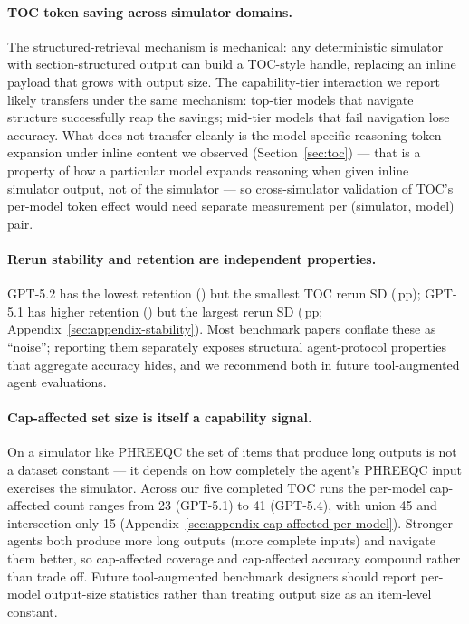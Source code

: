 \documentclass{article}
\begin{document}
\paragraph{TOC token saving across simulator domains.}
The structured-retrieval mechanism is mechanical: any deterministic simulator with section-structured output can build a TOC-style handle, replacing an inline payload that grows with output size. The capability-tier interaction we report likely transfers under the same mechanism: top-tier models that navigate structure successfully reap the savings; mid-tier models that fail navigation lose accuracy. What does not transfer cleanly is the model-specific reasoning-token expansion under inline content we observed (Section~\ref{sec:toc}) --- that is a property of how a particular model expands reasoning when given inline simulator output, not of the simulator --- so cross-simulator validation of TOC's per-model token effect would need separate measurement per (simulator, model) pair.

\paragraph{Rerun stability and retention are independent properties.}
GPT-5.2 has the lowest retention (\GPTFiveTwoRetention) but the smallest TOC rerun SD (\GPTFiveTwoTOCRerunSD\,pp); GPT-5.1 has higher retention (\GPTFiveOneRetention) but the largest rerun SD (\GPTFiveOneTOCRerunSD\,pp; Appendix~\ref{sec:appendix-stability}). Most benchmark papers conflate these as ``noise''; reporting them separately exposes structural agent-protocol properties that aggregate accuracy hides, and we recommend both in future tool-augmented agent evaluations.

\paragraph{Cap-affected set size is itself a capability signal.}
On a simulator like PHREEQC the set of items that produce long outputs is not a dataset constant — it depends on how completely the agent's PHREEQC input exercises the simulator. Across our five completed TOC runs the per-model cap-affected count ranges from 23 (GPT-5.1) to 41 (GPT-5.4), with union 45 and intersection only 15 (Appendix~\ref{sec:appendix-cap-affected-per-model}). Stronger agents both produce more long outputs (more complete inputs) and navigate them better, so cap-affected coverage and cap-affected accuracy compound rather than trade off. Future tool-augmented benchmark designers should report per-model output-size statistics rather than treating output size as an item-level constant.
\end{document}
